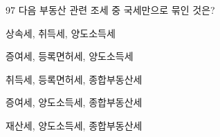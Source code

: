 \begin{question}{97}
다음 부동산 관련 조세 중 국세만으로 묶인 것은?
\begin{choices}
  \item 상속세, 취득세, 양도소득세
  \item 증여세, 등록면허세, 양도소득세
  \item 취득세, 등록면허세, 종합부동산세
  \item 증여세, 양도소득세, 종합부동산세
  \item 재산세, 양도소득세, 종합부동산세
\end{choices}
\end{question}
